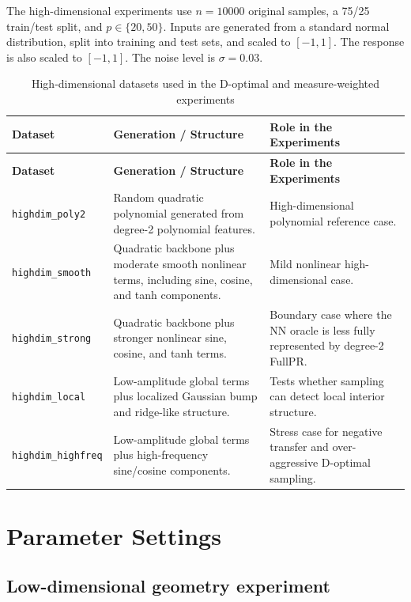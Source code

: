 \documentclass[UTF8,a4paper,11pt]{ctexart}
\begin{document}
The high-dimensional experiments use $n=10000$ original samples, a 75/25 train/test split, and $p\in\{20,50\}$. Inputs are generated from a standard normal distribution, split into training and test sets, and scaled to $[-1,1]$. The response is also scaled to $[-1,1]$. The noise level is $\sigma=0.03$.

\begin{longtable}{L{0.24\textwidth}L{0.36\textwidth}L{0.30\textwidth}}
\caption{High-dimensional datasets used in the D-optimal and measure-weighted experiments}
\label{tab:highdim-datasets} \\
\toprule
\textbf{Dataset} & \textbf{Generation / Structure} & \textbf{Role in the Experiments} \\
\midrule
\endfirsthead
\toprule
\textbf{Dataset} & \textbf{Generation / Structure} & \textbf{Role in the Experiments} \\
\midrule
\endhead
\bottomrule
\endlastfoot

\texttt{highdim\_poly2}
& Random quadratic polynomial generated from degree-2 polynomial features.
& High-dimensional polynomial reference case. \\

\texttt{highdim\_smooth}
& Quadratic backbone plus moderate smooth nonlinear terms, including sine, cosine, and tanh components.
& Mild nonlinear high-dimensional case. \\

\texttt{highdim\_strong}
& Quadratic backbone plus stronger nonlinear sine, cosine, and tanh terms.
& Boundary case where the NN oracle is less fully represented by degree-2 FullPR. \\

\texttt{highdim\_local}
& Low-amplitude global terms plus localized Gaussian bump and ridge-like structure.
& Tests whether sampling can detect local interior structure. \\

\texttt{highdim\_highfreq}
& Low-amplitude global terms plus high-frequency sine/cosine components.
& Stress case for negative transfer and over-aggressive D-optimal sampling. \\

\end{longtable}

\section{Parameter Settings}

\subsection{Low-dimensional geometry experiment}
\end{document}
